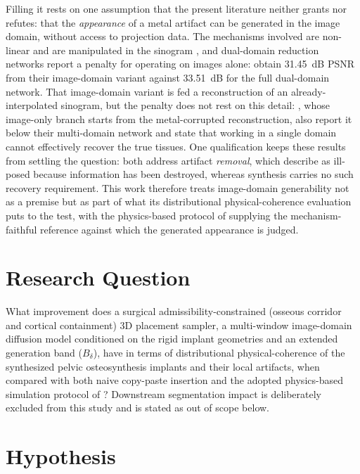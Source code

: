\documentclass[9pt]{extarticle}
\begin{document}
Filling it rests on one assumption that the present literature neither grants nor refutes: that the \emph{appearance} of a metal artifact can be generated in the image domain, without access to projection data. The mechanisms involved are non-linear and are manipulated in the sinogram \citep{deman1999}, and dual-domain reduction networks report a penalty for operating on images alone: \citet{lin2019} obtain 31.45~dB PSNR from their image-domain variant against 33.51~dB for the full dual-domain network. That image-domain variant is fed a reconstruction of an already-interpolated sinogram, but the penalty does not rest on this detail: \citet{li2024}, whose image-only branch starts from the metal-corrupted reconstruction, also report it below their multi-domain network and state that working in a single domain cannot effectively recover the true tissues. One qualification keeps these results from settling the question: both address artifact \emph{removal}, which \citet{lin2019} describe as ill-posed because information has been destroyed, whereas synthesis carries no such recovery requirement. This work therefore treats image-domain generability not as a premise but as part of what its distributional physical-coherence evaluation puts to the test, with the physics-based protocol of \citet{peters2025hybrid} supplying the mechanism-faithful reference against which the generated appearance is judged.

\section{Research Question}

What improvement does a surgical admissibility-constrained (osseous corridor and cortical containment) 3D placement sampler, a multi-window image-domain diffusion model conditioned on the rigid implant geometries and an extended generation band ($B_{\delta}$), have in terms of distributional physical-coherence of the synthesized pelvic osteosynthesis implants and their local artifacts, when compared with both naive copy-paste insertion and the adopted physics-based simulation protocol of \citet{peters2025hybrid}? Downstream segmentation impact is deliberately excluded from this study and is stated as out of scope below.

\section{Hypothesis}
\end{document}
